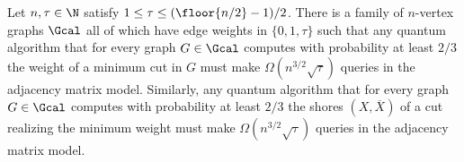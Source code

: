 \begin{theorem}
\label{thm:lower}
Let $n,\tau \in \N$ satisfy $1 \le \tau \le (\floor{n/2}-1)/2$.  There is a family of $n$-vertex graphs $\Gcal$ all of which have edge weights in $\{0,1,\tau\}$ 
such that any quantum algorithm that for every graph $G \in \Gcal$ computes with probability at least $2/3$ the weight of a minimum cut in $G$ must make 
$\Omega(n^{3/2}\sqrt{\tau})$ queries in the adjacency matrix model.  Similarly, any quantum algorithm that for every graph $G \in \Gcal$ computes with 
probability at least $2/3$ the shores $(X,\overline{X})$ of a cut realizing the minimum weight must make $\Omega(n^{3/2}\sqrt{\tau})$ queries in the adjacency matrix model.
\end{theorem}
